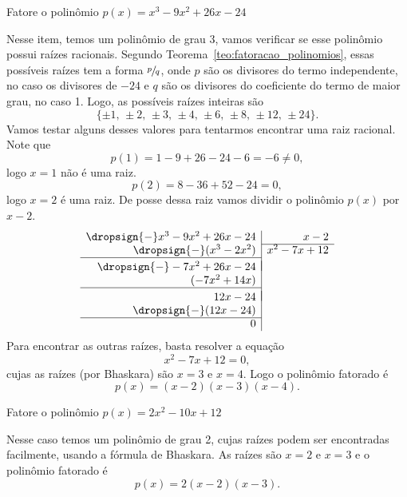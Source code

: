 \begin{example}
  Fatore o polinômio
  \(
    p(x) = x^3 - 9x^2 + 26x - 24
  \)

  \solution
  Nesse item, temos um polinômio de grau 3, vamos verificar se esse polinômio
  possui raízes racionais. Segundo Teorema~\ref{teo:fatoracao_polinomios},
  essas possíveis raízes tem a forma $\sfrac{p}{q}$, onde $p$ são os
  divisores do termo independente, no caso
  os divisores de $-24$ e $q$ são os divisores do coeficiente do termo de maior
  grau, no caso 1. Logo, as possíveis raízes inteiras são
  \[
    \{ \pm 1,\, \pm 2,\, \pm 3,\, \pm 4,\, \pm 6,\, \pm 8,\, \pm 12,\, \pm 24\}.
  \]
  Vamos testar alguns desses valores
  para tentarmos encontrar uma raiz racional.
  Note que
  \[
    p(1) = 1 - 9 + 26 - 24 - 6 = -6 \neq 0,
  \]
  logo $x=1$ não é uma raiz.
  \[
    p(2) = 8 - 36 + 52 - 24 = 0,
  \]
  logo $x=2$ é uma raiz.
  De posse dessa raiz vamos dividir o polinômio $p(x)$ por $x-2$.
  \[
    \begin{array}{r|r}
      \dropsign{-} x^3-9x^2+26x-24 & x-2       \\ \cline{2-2}
      \dropsign{-}( x^3-2x^2)      & x^2-7x+12 \\ \cline{1-1}
                                   &  \\[\dimexpr-\normalbaselineskip+\jot]
      \dropsign{-} -7x^2+26x-24    &  \\
      (-7x^2+14x)                  &  \\ \cline{1-1}
                                   &  \\[\dimexpr-\normalbaselineskip+\jot]
      12x-24                       &  \\
      \dropsign{-} (12x-24)        &  \\ \cline{1-1}
      0                            &
    \end{array}
  \]
  Para encontrar as outras raízes, basta resolver a equação
  \[
    x^2 - 7x + 12 = 0,
  \]
  cujas as raízes (por Bhaskara) são $x=3$ e $x=4$.
  Logo o polinômio fatorado é
  \[
    p(x) = (x-2)(x-3)(x-4).
  \]
\end{example}

\begin{example}
  Fatore o polinômio
  \(
    p(x) = 2x^2 - 10x + 12
  \)

  \solution
  Nesse caso temos um polinômio de grau 2, cujas raízes podem ser encontradas
  facilmente, usando a fórmula de Bhaskara. As raízes são $x=2$ e $x=3$ e o
  polinômio fatorado é
  \[
    p(x) = 2(x-2)(x-3).
  \]
\end{example}

